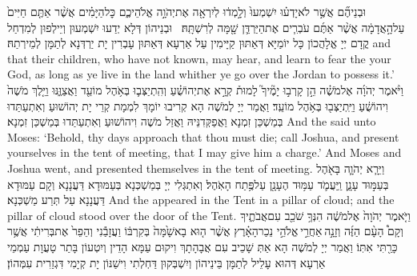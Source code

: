 {וּבְנֵיהֶ֞ם אֲשֶׁ֣ר לֹא\maqqaf יָדְע֗וּ יִשְׁמְעוּ֙ וְלָ֣מְד֔וּ לְיִרְאָ֖ה אֶת\maqqaf יְהֹוָ֣ה אֱלֹהֵיכֶ֑ם כׇּל\maqqaf הַיָּמִ֗ים אֲשֶׁ֨ר אַתֶּ֤ם חַיִּים֙ עַל\maqqaf הָ֣אֲדָמָ֔ה אֲשֶׁ֨ר אַתֶּ֜ם עֹבְרִ֧ים אֶת\maqqaf הַיַּרְדֵּ֛ן שָׁ֖מָּה לְרִשְׁתָּֽהּ׃ \petucha }
{וּבְנֵיהוֹן דְּלָא יְדַעוּ יִשְׁמְעוּן וְיֵילְפוּן לְמִדְחַל קֳדָם יְיָ אֱלָהֲכוֹן כָּל יוֹמַיָּא דְּאַתּוּן קַיָּימִין עַל אַרְעָא דְּאַתּוּן עָבְרִין יָת יַרְדְּנָא לְתַמָּן לְמֵירְתַהּ׃}
{and that their children, who have not known, may hear, and learn to fear the \lord\space your God, as long as ye live in the land whither ye go over the Jordan to possess it.’}{}
{וַיֹּ֨אמֶר יְהֹוָ֜ה אֶל\maqqaf מֹשֶׁ֗ה הֵ֣ן קָרְב֣וּ יָמֶ֘יךָ֮ לָמוּת֒ קְרָ֣א אֶת\maqqaf יְהוֹשֻׁ֗עַ וְהִֽתְיַצְּב֛וּ בְּאֹ֥הֶל מוֹעֵ֖ד וַאֲצַוֶּ֑נּוּ וַיֵּ֤לֶךְ מֹשֶׁה֙ וִיהוֹשֻׁ֔עַ וַיִּֽתְיַצְּב֖וּ בְּאֹ֥הֶל מוֹעֵֽד׃}
{וַאֲמַר יְיָ לְמֹשֶׁה הָא קְרִיבוּ יוֹמָךְ לִמְמָת קְרֵי יָת יְהוֹשׁוּעַ וְאִתְעַתַּדוּ בְּמַשְׁכַּן זִמְנָא וַאֲפַקְּדִנֵּיהּ וַאֲזַל מֹשֶׁה וִיהוֹשׁוּעַ וְאִתְעַתַּדוּ בְּמַשְׁכַּן זִמְנָא׃}
{And the \lord\space said unto Moses: ‘Behold, thy days approach that thou must die; call Joshua, and present yourselves in the tent of meeting, that I may give him a charge.’ And Moses and Joshua went, and presented themselves in the tent of meeting.}{}
{וַיֵּרָ֧א יְהֹוָ֛ה בָּאֹ֖הֶל בְּעַמּ֣וּד עָנָ֑ן וַֽיַּעֲמֹ֛ד עַמּ֥וּד הֶעָנָ֖ן עַל\maqqaf פֶּ֥תַח הָאֹֽהֶל׃}
{וְאִתְגְּלִי יְיָ בְּמַשְׁכְּנָא בְּעַמּוּדָא דַּעֲנָנָא וְקָם עַמּוּדָא דַּעֲנָנָא עַל תְּרַע מַשְׁכְּנָא׃}
{And the \lord\space appeared in the Tent in a pillar of cloud; and the pillar of cloud stood over the door of the Tent.}{}
{וַיֹּ֤אמֶר יְהֹוָה֙ אֶל\maqqaf מֹשֶׁ֔ה הִנְּךָ֥ שֹׁכֵ֖ב עִם\maqqaf אֲבֹתֶ֑יךָ וְקָם֩ הָעָ֨ם הַזֶּ֜ה וְזָנָ֣ה \legarmeh  אַחֲרֵ֣י \legarmeh  אֱלֹהֵ֣י נֵכַר\maqqaf הָאָ֗רֶץ אֲשֶׁ֨ר ה֤וּא בָא\maqqaf שָׁ֙מָּה֙ בְּקִרְבּ֔וֹ וַעֲזָבַ֕נִי וְהֵפֵר֙ אֶת\maqqaf בְּרִיתִ֔י אֲשֶׁ֥ר כָּרַ֖תִּי אִתּֽוֹ׃}
{וַאֲמַר יְיָ לְמֹשֶׁה הָא אַתְּ שָׁכֵיב עִם אֲבָהָתָךְ וִיקוּם עַמָּא הָדֵין וְיִטְעוֹן בָּתַר טָעֲוָת עַמְמֵי אַרְעָא דְּהוּא עָלֵיל לְתַמָּן בֵּינֵיהוֹן וְיִשְׁבְּקוּן דַּחְלְתִי וִישַׁנּוֹן יָת קְיָמִי דִּגְזַרִית עִמְּהוֹן׃}
